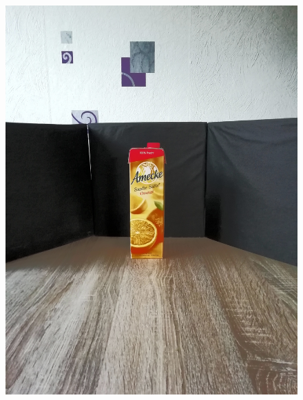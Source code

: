 \documentclass[a4paper,12pt,oneside]{article}
\begin{document}
\begin{figure}[htb]
\begin{minipage}[c]{0.2\textwidth}
\includegraphics[width=\textwidth]{Sources/Bild3_HA.jpg}
\end{minipage}
\hfill
\begin{minipage}[c]{0.08\textwidth}

\end{minipage}
\end{figure}
\end{document}
